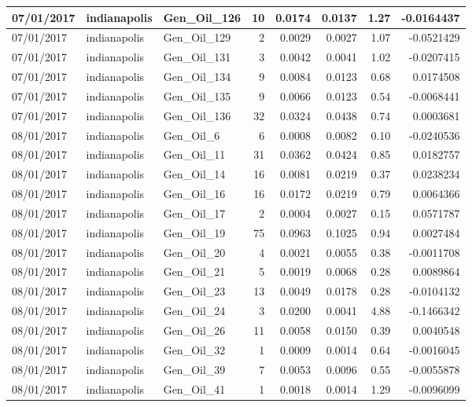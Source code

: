 \documentclass[
  letterpaper,
  DIV=11,
  numbers=noendperiod]{scrartcl}
\begin{document}
\begin{tabular}{l|l|l|r|r|r|r|r}
\hline
07/01/2017 & indianapolis & Gen\_Oil\_126 & 10 & 0.0174 & 0.0137 & 1.27 & -0.0164437\\
\hline
07/01/2017 & indianapolis & Gen\_Oil\_129 & 2 & 0.0029 & 0.0027 & 1.07 & -0.0521429\\
\hline
07/01/2017 & indianapolis & Gen\_Oil\_131 & 3 & 0.0042 & 0.0041 & 1.02 & -0.0207415\\
\hline
07/01/2017 & indianapolis & Gen\_Oil\_134 & 9 & 0.0084 & 0.0123 & 0.68 & 0.0174508\\
\hline
07/01/2017 & indianapolis & Gen\_Oil\_135 & 9 & 0.0066 & 0.0123 & 0.54 & -0.0068441\\
\hline
07/01/2017 & indianapolis & Gen\_Oil\_136 & 32 & 0.0324 & 0.0438 & 0.74 & 0.0003681\\
\hline
08/01/2017 & indianapolis & Gen\_Oil\_6 & 6 & 0.0008 & 0.0082 & 0.10 & -0.0240536\\
\hline
08/01/2017 & indianapolis & Gen\_Oil\_11 & 31 & 0.0362 & 0.0424 & 0.85 & 0.0182757\\
\hline
08/01/2017 & indianapolis & Gen\_Oil\_14 & 16 & 0.0081 & 0.0219 & 0.37 & 0.0238234\\
\hline
08/01/2017 & indianapolis & Gen\_Oil\_16 & 16 & 0.0172 & 0.0219 & 0.79 & 0.0064366\\
\hline
08/01/2017 & indianapolis & Gen\_Oil\_17 & 2 & 0.0004 & 0.0027 & 0.15 & 0.0571787\\
\hline
08/01/2017 & indianapolis & Gen\_Oil\_19 & 75 & 0.0963 & 0.1025 & 0.94 & 0.0027484\\
\hline
08/01/2017 & indianapolis & Gen\_Oil\_20 & 4 & 0.0021 & 0.0055 & 0.38 & -0.0011708\\
\hline
08/01/2017 & indianapolis & Gen\_Oil\_21 & 5 & 0.0019 & 0.0068 & 0.28 & 0.0089864\\
\hline
08/01/2017 & indianapolis & Gen\_Oil\_23 & 13 & 0.0049 & 0.0178 & 0.28 & -0.0104132\\
\hline
08/01/2017 & indianapolis & Gen\_Oil\_24 & 3 & 0.0200 & 0.0041 & 4.88 & -0.1466342\\
\hline
08/01/2017 & indianapolis & Gen\_Oil\_26 & 11 & 0.0058 & 0.0150 & 0.39 & 0.0040548\\
\hline
08/01/2017 & indianapolis & Gen\_Oil\_32 & 1 & 0.0009 & 0.0014 & 0.64 & -0.0016045\\
\hline
08/01/2017 & indianapolis & Gen\_Oil\_39 & 7 & 0.0053 & 0.0096 & 0.55 & -0.0055878\\
\hline
08/01/2017 & indianapolis & Gen\_Oil\_41 & 1 & 0.0018 & 0.0014 & 1.29 & -0.0096099\\

\end{tabular}
\end{document}
